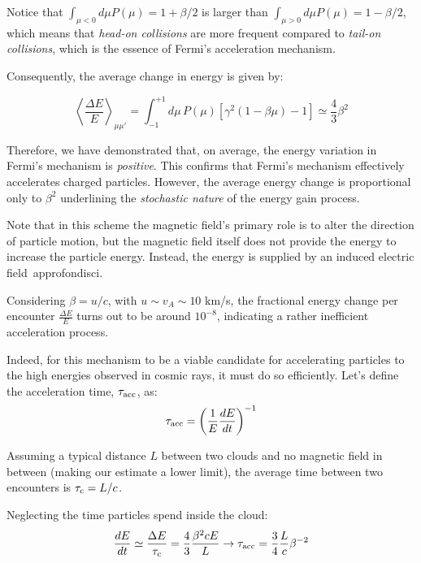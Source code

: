 Notice that \( \int_{\mu < 0} d\mu P(\mu) = 1 + \beta / 2 \) is larger than \( \int_{\mu > 0} d\mu P(\mu) = 1 - \beta/2 \), which means that \emph{head-on collisions} are more frequent compared to \emph{tail-on collisions}, which is the essence of Fermi’s acceleration mechanism.

Consequently, the average change in energy is given by:
%
\begin{remark}
\begin{equation}
\left\langle \frac{\Delta E}{E} \right\rangle_{\mu\mu'} 
= \int_{-1}^{+1} d\mu \, P(\mu) \left[ \gamma^2 \left( 1 - \beta \mu \right) - 1 \right] \simeq \frac{4}{3} \beta^2
\end{equation}
\end{remark}

Therefore, we have demonstrated that, on average, the energy variation in Fermi’s mechanism is \emph{positive}.
%
This confirms that Fermi's mechanism effectively accelerates charged particles. However, the average energy change is proportional only to \( \beta^2 \) underlining the \emph{stochastic nature} of the energy gain process.

Note that in this scheme the magnetic field's primary role is to alter the direction of particle motion, but the magnetic field itself does not provide the energy to increase the particle energy. Instead, the energy is supplied by an induced electric field~{\color{red}approfondisci}.

Considering \( \beta = u/c \), with \( u \sim v_A \sim 10 \) km/s, the fractional energy change per encounter \( \frac{\Delta E}{E} \) turns out to be around \( 10^{-8} \), indicating a rather inefficient acceleration process.

Indeed, for this mechanism to be a viable candidate for accelerating particles to the high energies observed in cosmic rays, it must do so efficiently.
%
Let's define the acceleration time, \( \tau_{\rm acc} \), as:
%
\begin{equation}
\tau_{\rm acc} = \left( \frac{1}{E} \frac{dE}{dt} \right)^{-1}
\end{equation}

Assuming a typical distance \( L \) between two clouds and no magnetic field in between (making our estimate a lower limit), the average time between two encounters is \( \tau_{\rm c} = L/c \).

Neglecting the time particles spend inside the cloud:
%
\begin{equation}
\frac{dE}{dt} \simeq \frac{\Delta E}{\tau_{\rm c}} = \frac{4}{3} \frac{\beta^2 c E}{L} \rightarrow \tau_{\rm acc} = \frac{3}{4} \frac{L}{c} \beta^{-2} 
\end{equation}

